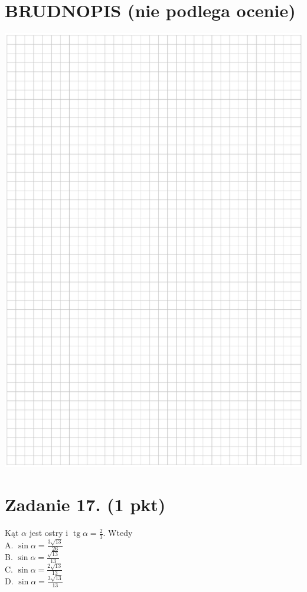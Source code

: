 \documentclass[10pt]{article}
\begin{document}
\section*{BRUDNOPIS (nie podlega ocenie)}
\begin{center}
\includegraphics[max width=\textwidth]{2024_11_21_779b7f825da3a12753feg-07}
\end{center}

\section*{Zadanie 17. (1 pkt)}
Kąt \(\alpha\) jest ostry i \(\operatorname{tg} \alpha=\frac{2}{3}\). Wtedy\\
A. \(\sin \alpha=\frac{3 \sqrt{13}}{26}\)\\
B. \(\sin \alpha=\frac{\sqrt{13}}{13}\)\\
C. \(\sin \alpha=\frac{2 \sqrt{13}}{13}\)\\
D. \(\sin \alpha=\frac{3 \sqrt{13}}{13}\)
\end{document}
